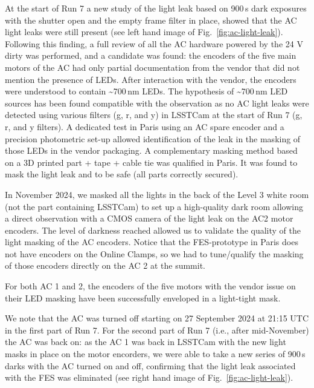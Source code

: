 At the start of Run 7 a new study of the light leak based on 900\,s
dark exposures with the shutter open and the empty frame filter in
place, showed that the AC light leaks were still present (see left hand image of Fig.~\ref{fig:ac-light-leak}). Following this finding, a full review of all the AC hardware powered
by the 24 V dirty was performed, and a candidate was found: the encoders
of the five main motors of the AC had only partial documentation from the
vendor that did not mention the presence of LEDs. After interaction with the
vendor, the encoders were understood to contain \textasciitilde700\,nm LEDs. The hypothesis of \textasciitilde700\,nm LED sources has been
found compatible with the observation as no AC light leaks were detected
using various filters (g, r, and y) in LSSTCam at the start of Run 7 (g, r, and y
filters). A dedicated test in Paris using an AC spare encoder and a
precision photometric set-up allowed identification of the leak in the masking of
those LEDs in the vendor packaging. A complementary masking method based
on a 3D printed part + tape + cable tie was qualified in Paris.  It was
found to mask the light leak and to be safe (all parts correctly secured).

In November 2024, we masked all the lights in the back of the Level 3 white
room (not the part containing LSSTCam) to set up a high-quality dark room
allowing a direct observation with a CMOS camera of the light leak on
the AC2 motor encoders. The level of darkness reached allowed us to
validate the quality of the light masking of the AC encoders. Notice that the
FES-prototype in Paris does not have encoders on the Online
Clamps, so we had to tune/qualify the masking of those encoders directly on the AC 2 at the summit.

For both AC 1 and 2, the encoders of the five motors with the vendor issue on
their LED masking have been successfully enveloped in a light-tight
mask.

We note that the AC was turned off starting on 27 September 2024 at 21:15 UTC in the
first part of Run 7. For the second part of Run 7 (i.e., after
mid-November) the AC was back on: as the AC 1 was back in LSSTCam with
the new light masks in place on the motor encorders, we were able to take a new series of
900\,s darks with the AC turned on and off, confirming that the light leak
associated with the FES was eliminated (see right hand image of Fig.~\ref{fig:ac-light-leak}).

